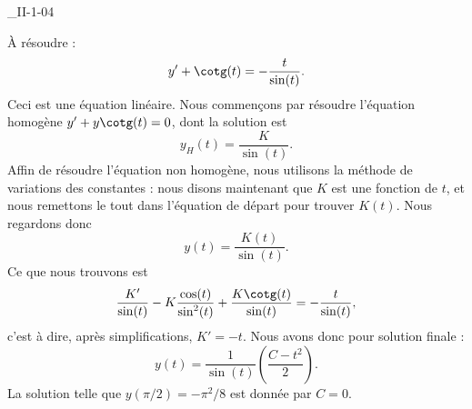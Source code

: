 

\begin{corrige}{_II-1-04}

À résoudre : 
\begin{equation}
	y'+\cotg(t)=-\frac{ t }{ \sin(t) }.
\end{equation}
Ceci est une équation linéaire. Nous commençons par résoudre l'équation homogène $y'+y\cotg(t)=0$, dont la solution est
\begin{equation}
	y_H(t)=\frac{ K }{ \sin(t) }.
\end{equation}
Affin de résoudre l'équation non homogène, nous utilisons la méthode de variations des constantes : nous disons maintenant que $K$ est une fonction de $t$, et nous remettons le tout dans l'équation de départ pour trouver $K(t)$. Nous regardons donc
\begin{equation}
	y(t)=\frac{ K(t) }{ \sin(t) }.
\end{equation}
Ce que nous trouvons est
\begin{equation}
	\frac{ K' }{ \sin(t) }-K\frac{ \cos(t) }{ \sin^2(t) }+\frac{ K\cotg(t) }{ \sin(t) }=-\frac{ t }{ \sin(t) },
\end{equation}
c'est à dire, après simplifications,  $K'=-t$. Nous avons donc pour solution finale :
\begin{equation}
	y(t)=\frac{ 1 }{ \sin(t) }\left( \frac{ C-t^2 }{ 2 } \right).
\end{equation}
La solution telle que $y(\pi/2)=-\pi^2/8$ est donnée par $C=0$.

\end{corrige}

